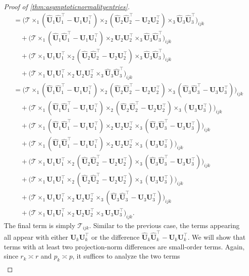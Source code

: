 \documentclass[10pt]{article}
\newcommand{\0}{{\mathbf{0}}}
\newcommand{\1}{{\mathbf{1}}}
\newcommand{\U}{{\mathbf{U}}}
\renewcommand{\t}{^{\top}}
\newcommand{\uhat}{\mathbf{\hat{U}}}
\renewcommand{\hat}{\widehat}
\renewcommand{\hat}{\widehat}
\begin{document}
\begin{proof}[Proof of \cref{thm:asymptoticnormalityentries}]
\begin{align*}
   &= \bigg( \mathcal{T} \times_1 (\uhat_1 \uhat_1\t - \U_1\U_1\t) \times_2 ( \uhat_2 \uhat_2\t - \U_2 \U_2\t) \times_3 \uhat_3\uhat_3\t \bigg)_{ijk} \\
   &\quad + \bigg( \mathcal{T} \times_1 (\uhat_1 \uhat_1\t - \U_1\U_1\t) \times_2 \U_2 \U_2\t \times_3 \uhat_3\uhat_3\t \bigg)_{ijk} \\
   &\quad + \bigg( \mathcal{T} \times_1  \U_1\U_1\t \times_2 (\uhat_2 \uhat_2\t - \U_2 \U_2\t) \times_3 \uhat_3\uhat_3\t \bigg)_{ijk} \\
    &\quad + \bigg( \mathcal{T} \times_1  \U_1\U_1\t \times_2 \U_2 \U_2\t \times_3 \uhat_3\uhat_3\t \bigg)_{ijk} \\
    &= \bigg( \mathcal{T} \times_1 (\uhat_1 \uhat_1\t - \U_1\U_1\t) \times_2 ( \uhat_2 \uhat_2\t - \U_2 \U_2\t) \times_3 (\uhat_3\uhat_3\t - \U_3 \U_3\t) \bigg)_{ijk} \\
    &\quad + \bigg( \mathcal{T} \times_1 (\uhat_1 \uhat_1\t - \U_1\U_1\t) \times_2 ( \uhat_2 \uhat_2\t - \U_2 \U_2\t) \times_3 (\U_3 \U_3\t) \bigg)_{ijk} \\
   &\quad + \bigg( \mathcal{T} \times_1 (\uhat_1 \uhat_1\t - \U_1\U_1\t) \times_2 \U_2 \U_2\t \times_3 (\uhat_3\uhat_3\t - \U_3 \U_3\t)\bigg)_{ijk} \\
   &\quad + \bigg( \mathcal{T} \times_1 (\uhat_1 \uhat_1\t - \U_1\U_1\t) \times_2 \U_2 \U_2\t \times_3 ( \U_3 \U_3\t)\bigg)_{ijk} \\
   &\quad + \bigg( \mathcal{T} \times_1  \U_1\U_1\t \times_2 (\uhat_2 \uhat_2\t - \U_2 \U_2\t) \times_3 (\uhat_3\uhat_3\t - \U_3 \U_3\t) \bigg)_{ijk} \\
   &\quad + \bigg( \mathcal{T} \times_1  \U_1\U_1\t \times_2 (\uhat_2 \uhat_2\t - \U_2 \U_2\t) \times_3 ( \U_3 \U_3\t) \bigg)_{ijk} \\
    &\quad + \bigg( \mathcal{T} \times_1  \U_1\U_1\t \times_2 \U_2 \U_2\t \times_3 (\uhat_3\uhat_3\t  - \U_3 \U_3\t)\bigg)_{ijk} \\
    &\quad + \bigg( \mathcal{T} \times_1  \U_1\U_1\t \times_2 \U_2 \U_2\t \times_3  \U_3 \U_3\t \bigg)_{ijk}.
\end{align*}
The final term is simply $\mathcal{T}_{ijk}$. Similar to the previous case, the terms appearing all appear with either $\U_k \U_k\t$ or the difference $\uhat_k \uhat_k\t - \U_k \U_k\t$.  We will show that terms with at least two projection-norm differences are small-order terms. Again, since $r_k \asymp r$ and $p_k \asymp p$, it suffices to analyze the two terms
\begin{align*}

\end{align*}
\end{proof}
\end{document}
